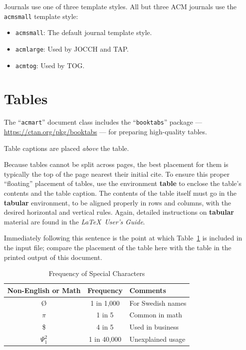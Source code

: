 \documentclass[acmlarge,screen]{acmart}
\begin{document}
Journals use one of three template styles. All but three ACM journals use the {\verb|acmsmall|} template style:
\begin{itemize}
\item {\verb|acmsmall|}: The default journal template style.
\item {\verb|acmlarge|}: Used by JOCCH and TAP.
\item {\verb|acmtog|}: Used by TOG.
\end{itemize}


\section{Tables}

The ``\verb|acmart|'' document class includes the ``\verb|booktabs|'' package --- \url{https://ctan.org/pkg/booktabs} --- for preparing high-quality tables. 

Table captions are placed {\it above} the table.

Because tables cannot be split across pages, the best placement for them is typically the top of the page nearest their initial cite.  To ensure this proper ``floating'' placement of tables, use the environment \textbf{table} to enclose the table's contents and the table caption.  The contents of the table itself must go in the \textbf{tabular} environment, to be aligned properly in rows and columns, with the desired horizontal and vertical rules.  Again, detailed instructions on \textbf{tabular} material are found in the \textit{\LaTeX\ User's Guide}.

Immediately following this sentence is the point at which Table~\ref{tab:freq} is included in the input file; compare the placement of the table here with the table in the printed output of this document.

\begin{table}
  \caption{Frequency of Special Characters}
  \label{tab:freq}
  \begin{tabular}{ccl}
    \toprule
    Non-English or Math&Frequency&Comments\\
    \midrule
    \O & 1 in 1,000& For Swedish names\\
    $\pi$ & 1 in 5& Common in math\\
    \$ & 4 in 5 & Used in business\\
    $\Psi^2_1$ & 1 in 40,000& Unexplained usage\\
  \bottomrule
\end{tabular}
\end{table}
\end{document}
